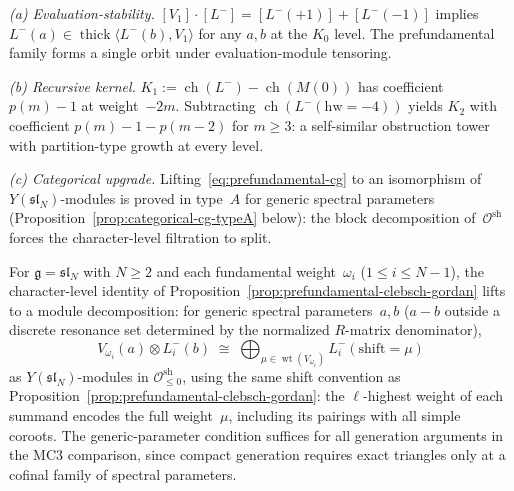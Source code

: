 \begin{remark}%
\label{rem:eval-stability-recursive-kernel}%
%
%
\emph{(a) Evaluation-stability.}
$[V_1] \cdot [L^-] = [L^-(+1)] + [L^-(-1)]$ implies
$L^-(a) \in \operatorname{thick}\langle L^-(b), V_1\rangle$
for any $a, b$ at the $K_0$ level. The prefundamental family
forms a single orbit under evaluation-module tensoring.

\emph{(b) Recursive kernel.}
$K_1 := \operatorname{ch}(L^-) - \operatorname{ch}(M(0))$ has
coefficient $p(m){-}1$ at weight~$-2m$. Subtracting
$\operatorname{ch}(L^-(\mathrm{hw} = -4))$ yields $K_2$ with
coefficient $p(m){-}1{-}p(m{-}2)$ for $m \geq 3$: a self-similar
obstruction tower with partition-type growth at every level.

\emph{(c) Categorical upgrade.}
Lifting~\eqref{eq:prefundamental-cg} to an isomorphism
of $Y(\mathfrak{sl}_N)$-modules is proved in type~$A$ for generic
spectral parameters
(Proposition~\ref{prop:categorical-cg-typeA} below): the block
decomposition of~$\mathcal{O}^{\mathrm{sh}}$
forces the character-level filtration to split.
\end{remark}

\begin{proposition}
\label{prop:categorical-cg-typeA}%
%
%
For\/ $\mathfrak{g} = \mathfrak{sl}_N$ with $N \geq 2$ and each
fundamental weight~$\omega_i$ ($1 \leq i \leq N{-}1$), the
character-level identity of
Proposition~\textup{\ref{prop:prefundamental-clebsch-gordan}}
lifts to a module decomposition: for generic spectral
parameters~$a,b$ \textup{(}$a - b$ outside a discrete resonance
set determined by the normalized $R$-matrix
denominator\textup{)},
\begin{equation}\label{eq:categorical-cg-typeA}
 V_{\omega_i}(a) \otimes L^-_i(b)
 \;\cong\;
 \bigoplus_{\mu \in \operatorname{wt}(V_{\omega_i})}
 L^-_i(\mathrm{shift} = \mu)
\end{equation}
as $Y(\mathfrak{sl}_N)$-modules in\/
$\mathcal{O}^{\mathrm{sh}}_{\leq 0}$, using the same shift
convention as
Proposition~\textup{\ref{prop:prefundamental-clebsch-gordan}}:
the $\ell$-highest weight of each summand encodes the full
weight~$\mu$, including its pairings with all simple coroots.
The generic-parameter condition suffices for all generation
arguments in the MC3 comparison, since compact generation requires
exact triangles only at a cofinal family of spectral parameters.
\end{proposition}

